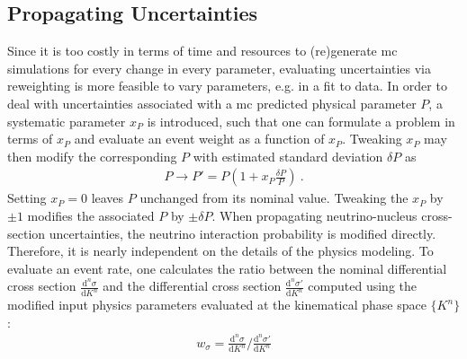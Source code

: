 \subsection{Propagating Uncertainties} \vspace{-2mm}
Since it is too costly in terms of time and resources to (re)generate \acrshort{mc} simulations for every change in every parameter, evaluating uncertainties via reweighting is more feasible to vary parameters, e.g. in a fit to data.
In order to deal with uncertainties associated with a \acrfull{mc} predicted physical parameter $P$, a systematic parameter $x_P$ is introduced, such that one can formulate a problem in terms of $x_P$ and evaluate an event weight as a function of $x_P$. Tweaking $x_P$ may then modify the corresponding $P$ with estimated standard deviation $\delta P$ as \cite{Andreopoulos:2009rq}
\vspace{-3mm}%
\begin{align} \label{tweak_parameters}
    P \longrightarrow P' = P\left( 1 + x_P \frac{\delta P}{P} \right) \ .
\end{align}
%
Setting $x_P=0$ leaves $P$ unchanged from its nominal value. Tweaking the $x_P$ by $\pm 1$ modifies the associated $P$ by $\pm \delta P$.
When propagating neutrino-nucleus cross-section uncertainties, the neutrino interaction probability is modified directly. Therefore, it is nearly independent on the details of the physics modeling. To evaluate an event rate, one calculates the ratio between the nominal differential cross section $\frac{\text{d}^n\sigma}{\text{d}K^n}$ and the differential cross section $\frac{\text{d}^n\sigma'}{\text{d}K^n}$ computed using the modified input physics parameters evaluated at the kinematical phase space $\{K^n\}$ \cite{Andreopoulos:2009rq}:
\vspace{-3mm}%
\begin{align} \label{event_weight}
    w_\sigma = \frac{\text{d}^n\sigma}{\text{d}K^n} \bigg/ \frac{\text{d}^n\sigma'}{\text{d}K^n}
\end{align}
\vspace{-3mm}%

